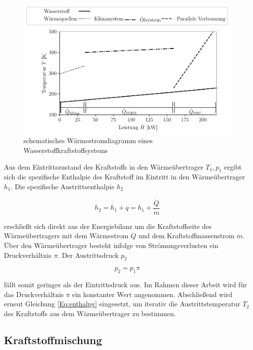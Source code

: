 \begin{figure}[ht]
	\centering
	\includegraphics[width=1\linewidth]{4_Abbildungen/2_Hauptteil/hx.pdf}
	\caption{schematisches Wärmestromdiagramm eines Wasserstoffkraftstoffsystems}
	\label{fig:hx}
\end{figure}
\FloatBarrier 

Aus dem Eintrittszustand des Kraftstoffs in den Wärmeübertrager $T_1, p_1$ ergibt sich die spezifische Enthalpie des Kraftstoff im Eintritt in den Wärmeübertrager $h_1$. Die spezifische Austrittsenthalpie $h_2$

\begin{equation}\label{Eq:energy-hx}
	h_2=h_1 +q=h_1+\frac{\dot{Q}}{\dot{m}}
\end{equation}

erschließt sich direkt aus der Energiebilanz um die Kraftstoffseite des Wärmeübertragers mit dem Wärmestrom $\dot{Q}$ und dem Kraftstoffmassenstrom $\dot{m}$. Über den Wärmeübertrager besteht infolge von Strömungsverlusten ein Druckverhältnis $\pi$. Der Austrittsdruck $p_2$

\begin{equation}\label{Eq:pressuredrop}
	p_2 = p_1 \pi
\end{equation}

fällt somit geringer als der Eintrittsdruck aus. Im Rahmen dieser Arbeit wird für das Druckverhältnis $\pi$ ein konstanter Wert angenommen. Abschließend wird erneut Gleichung \ref{Eq:enthalpy} eingesetzt, um iterativ die Austrittstemperatur $T_2$ des Kraftstoffs aus dem Wärmeübertrager zu bestimmen.

\subsection{Kraftstoffmischung}

